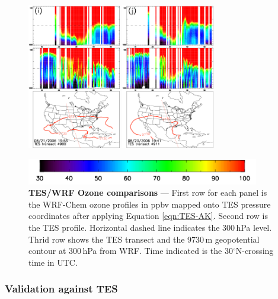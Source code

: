 \begin{figure}
\begin{center}
		\includegraphics[width=1.6in]{o3/o3_4900_ftuv}
		\includegraphics[width=1.6in]{o3/o3_4911_ftuv}
		
		\includegraphics[width=4in]{o3/o3_colorbar}
		\end{center}
	    	\caption[TES/WRF-Chem Ozone comparisons]{\textbf{TES/WRF Ozone comparisons} --- First row for each panel is the WRF-Chem
		ozone profiles in ppbv mapped onto TES pressure coordinates after applying Equation \ref{eqn:TES-AK}. Second row is the
		TES profile. Horizontal dashed line indicates the 300\,\unit{hPa} level. Thrid row shows the TES transect and the  9730\,\unit{m}
		geopotential contour at 300\,\unit{hPa} from WRF. Time indicated is the 30$^\circ$N-crossing time in \unit{UTC}.} \label{fig:2006/o3tes}
	\end{figure}

\subsubsection{Validation against TES}

